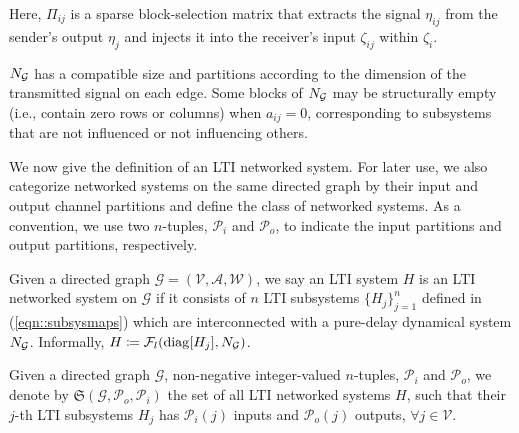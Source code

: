 Here, \(\Pi_{ij}\) is a sparse block-selection matrix that extracts the signal \(\eta_{ij}\) from the sender’s output \(\eta_j\) and injects it into the receiver’s input \(\zeta_{ij}\) within \(\zeta_i\). 
\begin{rem}
\(N_{\cal G}\) has a compatible size and partitions according to the dimension of the transmitted signal on each edge. 
Some blocks of \(N_{\cal G}\) may be structurally empty (i.e., contain zero rows or columns) when \(a_{ij} = 0\), corresponding to subsystems that are not influenced or not influencing others.
\end{rem}



We now give the definition of an LTI networked system. For later use, we also categorize networked systems on the same directed graph by their input and output channel partitions and define the class of networked systems. As a convention, we use two \(n\)-tuples, \(\mathcal{P}_i\) and \(\mathcal{P}_o\), to indicate the input partitions and output partitions, respectively.
\begin{defn}\label{defn:NWS}
Given a directed graph \(\mathcal{G}= (\mathcal{V}, \mathcal{A}, \mathcal{W})\), we say an LTI system \(H\) is an LTI networked system on  \(\mathcal{G}\) if it consists of \(n\) LTI subsystems \(\{H_j\}_{j = 1}^ n\) defined in (\ref{eqn::subsysmaps}) which are interconnected with a pure-delay dynamical system \(N_{\cal G}\). Informally, \(H \coloneqq {\mathcal{F}_l}({\mathrm{diag}}[H_j], N_{\cal G})\).
\end{defn}
\begin{defn}\label{defn:class_NWS}
Given a directed graph \(\mathcal{G}\), non-negative integer-valued \(n\)-tuples, \(\mathcal{P}_i\) and \(\mathcal{P}_o\), we denote by \(\mathfrak{S}(\mathcal{G}, \mathcal{P}_o, \mathcal{P}_i)\) the set of all LTI networked systems \(H\), such that their \(j\)-th LTI subsystems \(H_j\) has \(\mathcal{P}_i(j)\) inputs and \(\mathcal{P}_o(j)\) outputs, \(\forall j \in \mathcal{V}\).
\end{defn}


